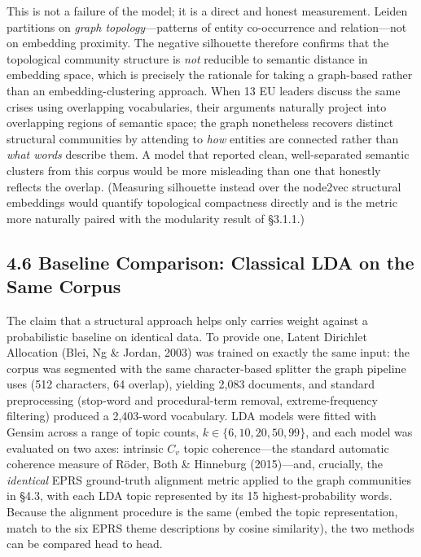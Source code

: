 \documentclass[11pt]{article}
\begin{document}
This is not a failure of the model; it is a direct and honest measurement. Leiden partitions on \emph{graph topology}---patterns of entity co-occurrence and relation---not on embedding proximity. The negative silhouette therefore confirms that the topological community structure is \emph{not} reducible to semantic distance in embedding space, which is precisely the rationale for taking a graph-based rather than an embedding-clustering approach. When 13 EU leaders discuss the same crises using overlapping vocabularies, their arguments naturally project into overlapping regions of semantic space; the graph nonetheless recovers distinct structural communities by attending to \emph{how} entities are connected rather than \emph{what words} describe them. A model that reported clean, well-separated semantic clusters from this corpus would be more misleading than one that honestly reflects the overlap. (Measuring silhouette instead over the node2vec structural embeddings would quantify topological compactness directly and is the metric more naturally paired with the modularity result of \S3.1.1.)

\subsection{4.6 Baseline Comparison: Classical LDA on the Same Corpus}

The claim that a structural approach helps only carries weight against a probabilistic baseline on identical data. To provide one, Latent Dirichlet Allocation (Blei, Ng \& Jordan, 2003) was trained on exactly the same input: the corpus was segmented with the same character-based splitter the graph pipeline uses (512 characters, 64 overlap), yielding 2{,}083 documents, and standard preprocessing (stop-word and procedural-term removal, extreme-frequency filtering) produced a 2{,}403-word vocabulary. LDA models were fitted with Gensim across a range of topic counts, $k \in \{6, 10, 20, 50, 99\}$, and each model was evaluated on two axes: intrinsic $C_v$ topic coherence---the standard automatic coherence measure of R\"{o}der, Both \& Hinneburg (2015)---and, crucially, the \emph{identical} EPRS ground-truth alignment metric applied to the graph communities in \S4.3, with each LDA topic represented by its 15 highest-probability words. Because the alignment procedure is the same (embed the topic representation, match to the six EPRS theme descriptions by cosine similarity), the two methods can be compared head to head.
\end{document}
